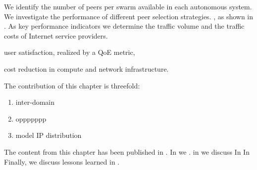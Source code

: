 We identify the number of peers per swarm available in each autonomous system. We investigate the performance of different peer selection strategies. , as shown in .
As key performance indicators we determine the traffic volume and the traffic costs of Internet service providers.
\begin{enumerate*}
\item user satisfaction, realized by a \gls{QoE} metric,
\item cost reduction in compute and network infrastructure.
\end{enumerate*}

The contribution of this chapter is threefold:
\begin{enumerate}
\item inter-domain
\item oppppppp
\item model IP distribution
\end{enumerate}

The content from this chapter has been published in \cite{burger2012profit,burger2014vantage,burger2016hierarchical}.
In  we .
in  we discuss
In 
In 
Finally, we discuss lessons learned in .






